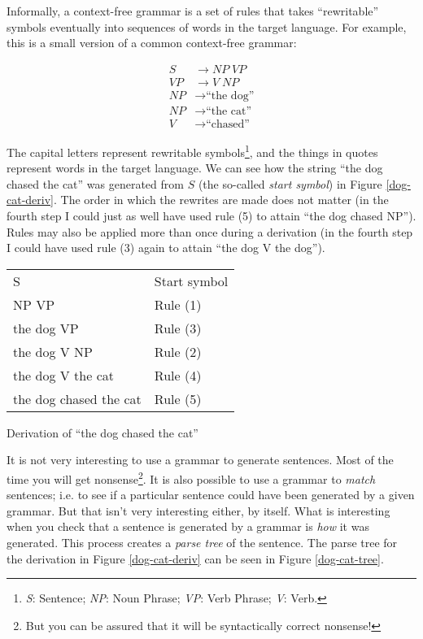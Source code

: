 \documentclass[12pt]{article}
\newcommand{\defn}[1]{\textit{#1}}
\begin{document}
Informally, a context-free grammar is a set of rules that takes
``rewritable'' symbols eventually into sequences of words in the target
language.  For example, this is a small version of a common context-free
grammar:

\begin{align}
S  &\rightarrow \mathit{NP} \; \mathit{VP}      \tag{1} \\
\mathit{VP} &\rightarrow V \; \mathit{NP}       \tag{2} \\
\mathit{NP} &\rightarrow \text{``the dog''}     \tag{3} \\
\mathit{NP} &\rightarrow \text{``the cat''}     \tag{4} \\
V  &\rightarrow \text{``chased''}               \tag{5}
\end{align}

The capital letters represent rewritable symbols\footnote{\textit{S}:
Sentence; \textit{NP}: Noun Phrase; \textit{VP}: Verb Phrase;
\textit{V}: Verb.}, and the things in quotes represent words in the
target language.  We can see how the string ``the dog chased the cat''
was generated from $S$ (the so-called \defn{start symbol}) in Figure
\ref{dog-cat-deriv}.  The order in which the rewrites are made does not
matter (in the fourth step I could just as well have used rule (5) to
attain ``the dog chased NP'').  Rules may also be applied more than once
during a derivation (in the fourth step I could have used rule (3) again
to attain ``the dog V the dog'').

\begin{Figure}
\begin{tabularx}{\linewidth}{X|X}
S                      & Start symbol \\
NP VP                  & Rule (1) \\
the dog VP             & Rule (3) \\
the dog V NP           & Rule (2) \\
the dog V the cat      & Rule (4) \\
the dog chased the cat & Rule (5) \\
\end{tabularx}
\caption{Derivation of ``the dog chased the cat''}
\label{dog-cat-deriv}
\end{Figure}

It is not very interesting to use a grammar to generate sentences.  Most
of the time you will get nonsense\footnote{But you can be assured that
it will be syntactically correct nonsense!}.  It is also possible to use
a grammar to \textit{match} sentences; i.e. to see if a particular
sentence could have been generated by a given grammar.   But that isn't
very interesting either, by itself.  What is interesting when you
check that a sentence is generated by a grammar is \textit{how} it was
generated.  This process creates a \defn{parse tree} of the sentence.
The parse tree for the derivation in Figure \ref{dog-cat-deriv} can be
seen in Figure \ref{dog-cat-tree}.
\end{document}

